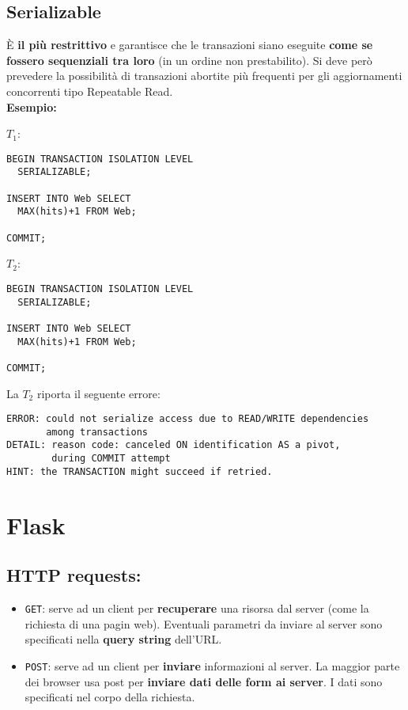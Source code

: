 \documentclass[a4paper, 10pt]{article}
\begin{document}
	\subsection{Serializable}
		È \textbf{il più restrittivo} e garantisce che le transazioni siano eseguite \textbf{come se fossero sequenziali tra loro} (in un ordine non prestabilito). Si deve però prevedere la possibilità di transazioni abortite più frequenti per gli aggiornamenti concorrenti tipo Repeatable Read.\\
		\textbf{Esempio:}
		\begin{multicols}{2}
		\noindent
		$ T_1 $:
		\begin{lstlisting}
BEGIN TRANSACTION ISOLATION LEVEL
  SERIALIZABLE;
  
INSERT INTO Web SELECT
  MAX(hits)+1 FROM Web;

COMMIT;
		\end{lstlisting}
		\columnbreak
		$ T_2 $:
		\begin{lstlisting}
BEGIN TRANSACTION ISOLATION LEVEL
  SERIALIZABLE;

INSERT INTO Web SELECT
  MAX(hits)+1 FROM Web;

COMMIT;
		\end{lstlisting}
		\end{multicols}
		
		La $ T_2 $ riporta il seguente errore:
		\begin{lstlisting}
ERROR: could not serialize access due to READ/WRITE dependencies 
       among transactions
DETAIL: reason code: canceled ON identification AS a pivot, 
        during COMMIT attempt
HINT: the TRANSACTION might succeed if retried.
		\end{lstlisting}
	\newpage		
			
			
		
	\section{Flask}
	\lstset{language=Python}
		\subsection{HTTP requests:}
			\begin{itemize}
				\item \lstinline|GET|: serve ad un client per \textbf{recuperare} una risorsa dal server (come la richiesta di una pagin web). Eventuali parametri da inviare al server sono specificati nella \textbf{query string} dell'URL.
				\item \lstinline|POST|: serve ad un client per \textbf{inviare} informazioni al server. La maggior parte dei browser usa post per \textbf{inviare dati delle form ai server}. I dati sono specificati nel corpo della richiesta.
			\end{itemize}
\end{document}
